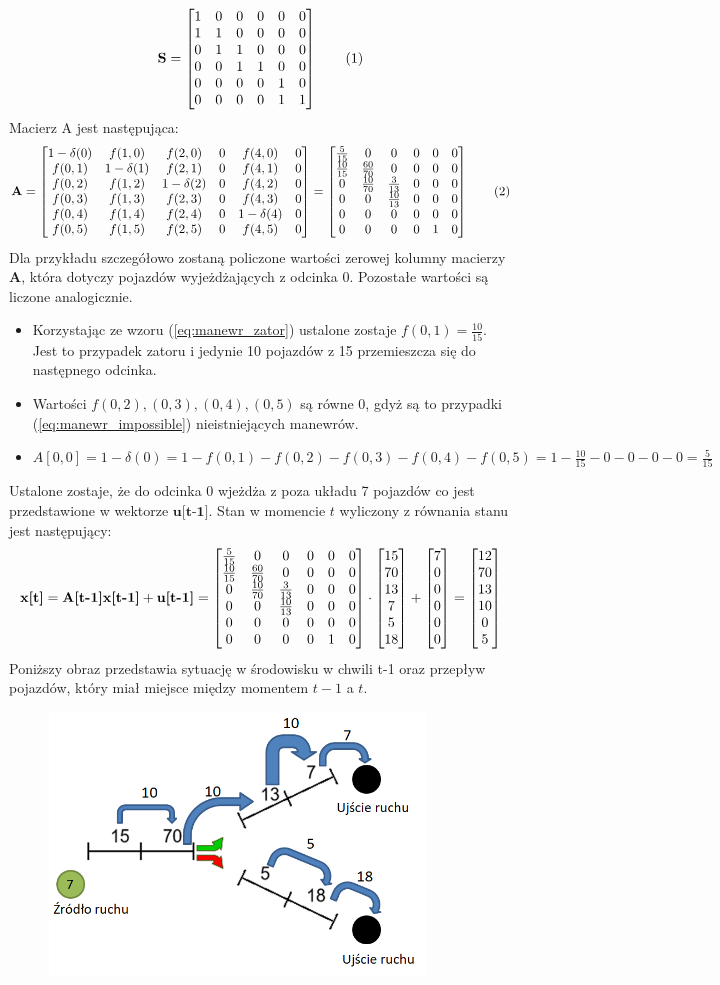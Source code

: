\documentclass[12pt]{book}
\theoremstyle{plain}
\newcommand\addtag{\refstepcounter{equation}
	\renewcommand{\labelenumii}{\theenumii}
	\renewcommand{\theenumii}{\theenumi.\arabic{enumii}.}
	\tag{\theequation}}
\let\oldref\ref
\renewcommand{\ref}[1]{(\oldref{#1})}
\begin{document}
\[\textbf{S}= \ScaseZero \addtag \]
Macierz A jest następująca:
\[\textbf{A}= \AenvXI = \AcaseZero \addtag \]
\def \utMinusI{\begin{bmatrix} 
7 \\ 0 \\ 0 \\ 0 \\ 0 \\ 0 
\end{bmatrix}}
\def \xtMinusI{\begin{bmatrix} 
15 \\ 70 \\ 13 \\ 7 \\ 5 \\ 18	
\end{bmatrix}}
\def \xt{\begin{bmatrix} 
		12 \\ 70 \\ 13 \\ 10 \\ 0 \\ 5	
\end{bmatrix}} \noindent
Dla przykładu szczegółowo zostaną policzone wartości zerowej kolumny macierzy $\textbf{A}$, która dotyczy pojazdów wyjeżdżających z odcinka 0. Pozostałe wartości są liczone analogicznie.
\begin{itemize}
	\item Korzystając ze wzoru \ref{eq:manewr_zator} ustalone zostaje $f(0,1)=\frac{10}{15}$. Jest to przypadek zatoru i jedynie 10 pojazdów z 15 przemieszcza się do następnego odcinka.
	\item Wartości $f(0,2),(0,3),(0,4),(0,5)$ są równe $0$, gdyż są to przypadki \ref{eq:manewr_impossible} nieistniejących manewrów.
	\item $A[0,0]=1-\delta(0)=1-f(0,1)-f(0,2)-f(0,3)-f(0,4)-f(0,5)=1- \frac{10}{15} -0-0-0-0= \frac{5}{15}$
\end{itemize}
Ustalone zostaje, że do odcinka 0 wjeżdża z poza układu 7 pojazdów co jest przedstawione w wektorze $\textbf{u[t-1]}$. Stan w momencie $t$ wyliczony z równania stanu jest następujący:
\[\textbf{x[t]}=\textbf{A[t-1]x[t-1]}+\textbf{u[t-1]}=\AcaseZero \cdot \xtMinusI + \utMinusI = \xt \]
Poniższy obraz przedstawia sytuację w środowisku w chwili t-1 oraz przepływ pojazdów, który miał miejsce między momentem $t-1$ a $t$.
\begin{figure}[H]
	\centering
	\includegraphics[width=10cm]{images/env_11_case_0_przeplyw}
	\label{fig:env_11_case_0_przeplyw}
\end{figure}\noindent
\end{document}
